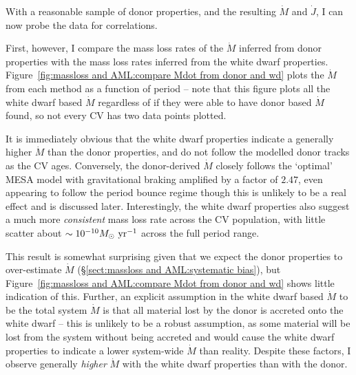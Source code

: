 \label{chpt:discussion} %

With a reasonable sample of donor properties, and the resulting $\dot M$ and $\dot J$, I can now probe the data for correlations.

First, however, I compare the mass loss rates of the $\dot M$ inferred from donor properties with the mass loss rates inferred from the white dwarf properties.
Figure~\ref{fig:massloss and AML:compare Mdot from donor and wd} plots the $\dot M$ from each method as a function of period -- note that this figure plots all the white dwarf based $\dot M$ regardless of if they were able to have donor based $\dot M$ found, so not every CV has two data points plotted.

It is immediately obvious that the white dwarf properties indicate a generally higher $\dot M$ than the donor properties, and do not follow the modelled donor tracks as the CV ages.
Conversely, the donor-derived $\dot M$ closely follows the `optimal' MESA model with gravitational braking amplified by a factor of $2.47$, even appearing to follow the period bounce regime though this is unlikely to be a real effect and is discussed later.
Interestingly, the white dwarf properties also suggest a much more \textit{consistent} mass loss rate across the CV population, with little scatter about $\sim 10^{-10} M_\odot~{\rm yr}^{-1}$ across the full period range.

This result is somewhat surprising given that we expect the donor properties to over-estimate $\dot M$ (\S\ref{sect:massloss and AML:systematic bias}), but Figure~\ref{fig:massloss and AML:compare Mdot from donor and wd} shows little indication of this.
Further, an explicit assumption in the white dwarf based $\dot M$ to be the total system $\dot M$ is that all material lost by the donor is accreted onto the white dwarf -- this is unlikely to be a robust assumption, as some material will be lost from the system without being accreted and would cause the white dwarf properties to indicate a lower system-wide $\dot M$ than reality.
Despite these factors, I observe generally \textit{higher} $\dot M$ with the white dwarf properties than with the donor.

